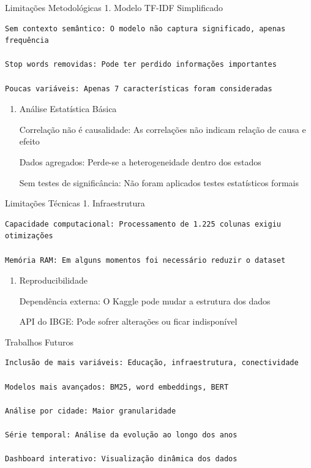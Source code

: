 \documentclass[
  11pt,
  letterpaper,
  DIV=11,
  numbers=noendperiod]{scrartcl}
\begin{document}
Limitações Metodológicas 1. Modelo TF-IDF Simplificado

\begin{verbatim}
Sem contexto semântico: O modelo não captura significado, apenas frequência

Stop words removidas: Pode ter perdido informações importantes

Poucas variáveis: Apenas 7 características foram consideradas
\end{verbatim}

\begin{enumerate}
\def\labelenumi{\arabic{enumi}.}
\setcounter{enumi}{1}
\item
  Análise Estatística Básica

  Correlação não é causalidade: As correlações não indicam relação de
  causa e efeito

  Dados agregados: Perde-se a heterogeneidade dentro dos estados

  Sem testes de significância: Não foram aplicados testes estatísticos
  formais
\end{enumerate}

Limitações Técnicas 1. Infraestrutura

\begin{verbatim}
Capacidade computacional: Processamento de 1.225 colunas exigiu otimizações

Memória RAM: Em alguns momentos foi necessário reduzir o dataset
\end{verbatim}

\begin{enumerate}
\def\labelenumi{\arabic{enumi}.}
\setcounter{enumi}{1}
\item
  Reproducibilidade

  Dependência externa: O Kaggle pode mudar a estrutura dos dados

  API do IBGE: Pode sofrer alterações ou ficar indisponível
\end{enumerate}

Trabalhos Futuros

\begin{verbatim}
Inclusão de mais variáveis: Educação, infraestrutura, conectividade

Modelos mais avançados: BM25, word embeddings, BERT

Análise por cidade: Maior granularidade

Série temporal: Análise da evolução ao longo dos anos

Dashboard interativo: Visualização dinâmica dos dados
\end{verbatim}
\end{document}
